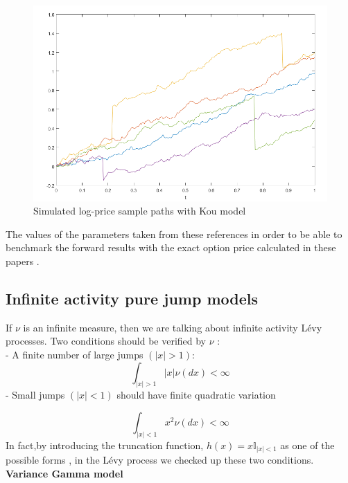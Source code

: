 \documentclass[12pt]{report}
\begin{document}
\begin{figure}[h]

\centering
\includegraphics[scale=0.7]{kou.png} 
\caption{Simulated log-price sample paths with Kou model }
\end{figure}

The values of the parameters  taken from these  references in order to be able to benchmark the forward results  with the exact option price calculated in these papers .

\subsection{Infinite activity pure jump models}

If $\nu$ is an infinite measure, then we are talking about infinite activity Lévy processes. Two conditions should be verified by $\nu$ :\\
- A finite number of large jumps $(|x|>1)$:
$$\int_{|x|>1}|x|\nu( dx)< \infty $$
- Small jumps $(|x|< 1)$ should have finite quadratic variation 

$$\int_{|x|<1}x^2\nu( dx)< \infty $$
In fact,by introducing the truncation function, $h(x)= x\mathbb{I}_{|x|< 1}$ as one of the possible forms , in the Lévy process we checked up these two conditions.
\\

\large\textbf{Variance Gamma model}\\
\end{document}
